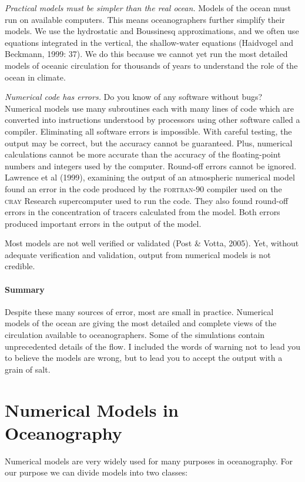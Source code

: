 \textit{Practical models must be simpler than the real ocean.} Models
of the ocean must run on available computers. This means
oceanographers further simplify their models. We use the hydrostatic
and Boussinesq approximations, and we
often use equations integrated in the vertical, the shallow-water
equations (Haidvogel and Beckmann, 1999: 37). We do this because we
cannot yet run the most detailed models of oceanic circulation for
thousands of years to understand the role of the ocean in climate.

\textit{Numerical code has errors.} Do you know of any software
without bugs? Numerical models use many subroutines each with many
lines of code which are converted into instructions understood by
processors using other software called a compiler. Eliminating all
software errors is impossible. With careful testing, the output may be
correct, but the accuracy cannot be
guaranteed. Plus, numerical calculations cannot be more accurate than
the accuracy of the floating-point numbers and integers used by the
computer.  Round-off errors cannot be ignored. Lawrence et al (1999),
examining the output of an atmospheric numerical model found an error
in the code produced by the \textsc{fortran-90} compiler used on the
\textsc{cray} Research supercomputer used to run the code. They also
found round-off errors in the concentration of tracers calculated from
the model. Both errors produced important errors in the output of the
model.

Most models are not well verified or validated (Post \& Votta,
2005). Yet, without adequate verification and validation, output from
numerical models is not credible.

\paragraph{Summary}
Despite these many sources of error, most are small in
practice. Numerical models of the ocean are giving the most detailed
and complete views of the circulation available to
oceanographers. Some of the simulations contain unprecedented details
of the flow. I included the words of warning not to lead you to
believe the models are wrong, but to lead you to accept the output
with a grain of salt.

\section{Numerical Models in Oceanography}
Numerical models are very widely used for many purposes in
oceanography. For our purpose we can divide models into two classes:

